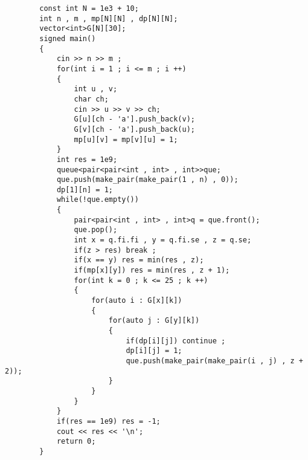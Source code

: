 \documentclass[E:/GsjzTle/main/main.tex]{subfiles}
\begin{document}
	\begin{lstlisting}
		const int N = 1e3 + 10;
		int n , m , mp[N][N] , dp[N][N]; 
		vector<int>G[N][30]; 
		signed main()
		{
			cin >> n >> m ;
			for(int i = 1 ; i <= m ; i ++)
			{
				int u , v;
				char ch;
				cin >> u >> v >> ch;
				G[u][ch - 'a'].push_back(v);
				G[v][ch - 'a'].push_back(u);
				mp[u][v] = mp[v][u] = 1;
			}
			int res = 1e9;
			queue<pair<pair<int , int> , int>>que;
			que.push(make_pair(make_pair(1 , n) , 0));
			dp[1][n] = 1;
			while(!que.empty())
			{
				pair<pair<int , int> , int>q = que.front();
				que.pop();
				int x = q.fi.fi , y = q.fi.se , z = q.se;
				if(z > res) break ;
				if(x == y) res = min(res , z);
				if(mp[x][y]) res = min(res , z + 1);
				for(int k = 0 ; k <= 25 ; k ++)
				{
					for(auto i : G[x][k])
					{
						for(auto j : G[y][k])
						{
							if(dp[i][j]) continue ;
							dp[i][j] = 1;
							que.push(make_pair(make_pair(i , j) , z + 2));
						}
					}
				}
			}
			if(res == 1e9) res = -1;
			cout << res << '\n';
			return 0;
		}
	\end{lstlisting}
	
\end{document}
